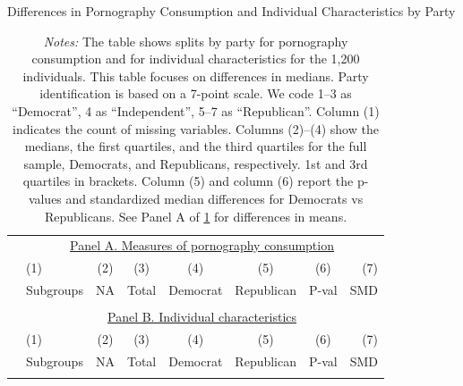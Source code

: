 \documentclass[12pt,twoside]{article}
\begin{document}
\begin{table}[!ht] \centering \ssmall \setlength\tabcolsep{9 pt}
	\caption{Differences in Pornography Consumption and Individual Characteristics by Party}
	\label{tab:characteristics_split_by_party}
	\begin{adjustbox}{max width=\textwidth}
		\begin{tabular}{@{\hspace{0\tabcolsep}}llrcccrr@{\hspace{0\tabcolsep}}}
			\toprule
			&\multicolumn{7}{c}{\underline{Panel A. Measures of pornography consumption}}\\
			&\multicolumn{1}{l}{(1)}&\multicolumn{1}{c}{(2)}&\multicolumn{1}{c}{(3)}&\multicolumn{1}{c}{(4)}&\multicolumn{1}{c}{(5)}&\multicolumn{1}{c}{(6)}&\multicolumn{1}{r}{(7)}\\			
			&\multicolumn{1}{l}{Subgroups}&\multicolumn{1}{c}{NA}&\multicolumn{1}{c}{Total}&\multicolumn{1}{c}{Democrat}&\multicolumn{1}{c}{Republican}&\multicolumn{1}{c}{P-val}&\multicolumn{1}{r}{SMD}\\
			\cmidrule{2-8}
			\\
			\cmidrule{2-8}
			&\multicolumn{7}{c}{\underline{Panel B. Individual characteristics}}\\
			&\multicolumn{1}{l}{(1)}&\multicolumn{1}{c}{(2)}&\multicolumn{1}{c}{(3)}&\multicolumn{1}{c}{(4)}&\multicolumn{1}{c}{(5)}&\multicolumn{1}{c}{(6)}&\multicolumn{1}{r}{(7)}\\			
			&\multicolumn{1}{l}{Subgroups}&\multicolumn{1}{c}{NA}&\multicolumn{1}{c}{Total}&\multicolumn{1}{c}{Democrat}&\multicolumn{1}{c}{Republican}&\multicolumn{1}{c}{P-val}&\multicolumn{1}{r}{SMD}\\
			\cmidrule{2-8}
			\\
			\bottomrule
		\end{tabular}
	\end{adjustbox}
	\caption*{\scriptsize \emph{Notes:}
		The table shows splits by party for pornography consumption and for individual characteristics for the 1,200 individuals.
		This table focuses on differences in medians.
		Party identification is based on a 7-point scale. We code 1--3 as ``Democrat'', 4 as ``Independent'', 5--7 as ``Republican''.
		Column (1) indicates the count of missing variables.
		Columns (2)--(4) show the medians, the first quartiles, and the third quartiles for the full sample, Democrats, and Republicans, respectively.
		1st and 3rd quartiles in brackets.
		Column (5) and column (6) report the p-values and standardized median differences for Democrats vs Republicans.
		See Panel A of \cref{tab:characteristics_split_by_party} for differences in means.
	}
\end{table}
\end{document}
